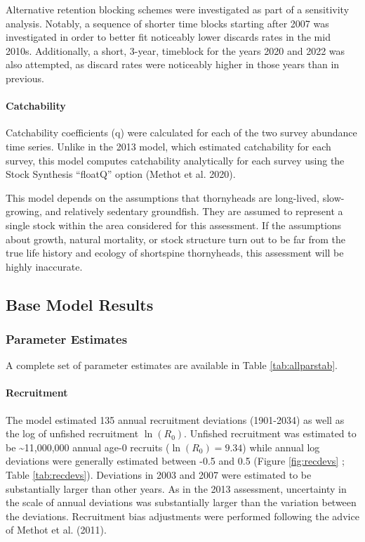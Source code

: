 \documentclass[11pt,
  english,
  letterpaper,
]{article}
\begin{document}
Alternative retention blocking schemes were investigated as part of a sensitivity analysis. Notably, a sequence of shorter time blocks starting after 2007 was investigated in order to better fit noticeably lower discards rates in the mid 2010s. Additionally, a short, 3-year, timeblock for the years 2020 and 2022 was also attempted, as discard rates were noticeably higher in those years than in previous.

\hypertarget{catchability}{%
\paragraph{Catchability}\label{catchability}}

Catchability coefficients (q) were calculated for each of the two survey abundance time series. Unlike in the 2013 model, which estimated catchability for each survey, this model computes catchability analytically for each survey using the Stock Synthesis ``floatQ'' option (Methot et al. 2020).

This model depends on the assumptions that thornyheads are long-lived, slow-growing, and relatively sedentary groundfish. They are assumed to represent a single stock within the area considered for this assessment. If the assumptions about growth, natural mortality, or stock structure turn out to be far from the true life history and ecology of shortspine thornyheads, this assessment will be highly inaccurate.

\hypertarget{base-model-results}{%
\subsection{Base Model Results}\label{base-model-results}}

\hypertarget{parameter-estimates}{%
\subsubsection{Parameter Estimates}\label{parameter-estimates}}

A complete set of parameter estimates are available in Table \ref{tab:allparstab}.

\hypertarget{recruitment-1}{%
\paragraph{Recruitment}\label{recruitment-1}}

The model estimated 135 annual recruitment deviations (1901-2034) as well as the log of unfished recruitment \(\ln(R_0)\). Unfished recruitment was estimated to be \textasciitilde11,000,000 annual age-0 recruits (\(\ln(R_0) = 9.34\)) while annual log deviations were generally estimated between -0.5 and 0.5 (Figure \ref{fig:recdevs} ; Table \ref{tab:recdevs}). Deviations in 2003 and 2007 were estimated to be substantially larger than other years. As in the 2013 assessment, uncertainty in the scale of annual deviations was substantially larger than the variation between the deviations. Recruitment bias adjustments were performed following the advice of Methot et al. (2011).
\end{document}
